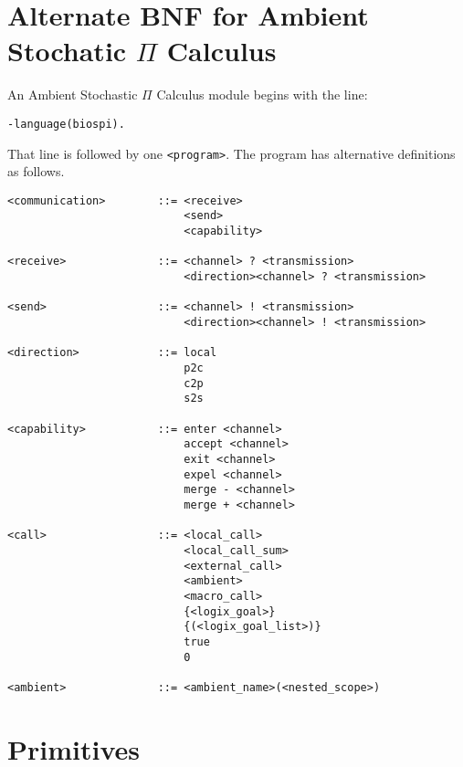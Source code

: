 \newpage
\section{Alternate BNF for Ambient Stochatic $\Pi$ Calculus}
\label{ASPICBNF}
An Ambient Stochastic $\Pi$ Calculus module begins with the line:

\begin{verbatim}
-language(biospi).
\end{verbatim}

\noindent
That line is followed by one \verb+<program>+.  The program
has alternative definitions as follows.

\begin{verbatim}
<communication>        ::= <receive>
                           <send>
                           <capability>

<receive>              ::= <channel> ? <transmission>
                           <direction><channel> ? <transmission>

<send>                 ::= <channel> ! <transmission>
                           <direction><channel> ! <transmission>

<direction>            ::= local
                           p2c
                           c2p
                           s2s

<capability>           ::= enter <channel>
                           accept <channel>
                           exit <channel>
                           expel <channel>
                           merge - <channel>
                           merge + <channel>

<call>                 ::= <local_call>
                           <local_call_sum>
                           <external_call>
                           <ambient>
                           <macro_call>
                           {<logix_goal>}
                           {(<logix_goal_list>)}
                           true
                           0

<ambient>              ::= <ambient_name>(<nested_scope>)
\end{verbatim}

\section{Primitives}

